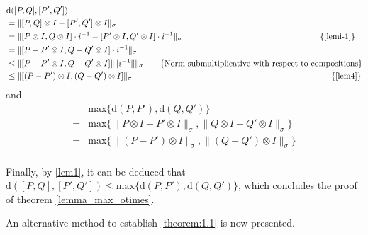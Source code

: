 \begin{equation} \label{eq:proof_theorem1.1_esq}
  \begin{split}
    & \text{d} ([P,Q],[P',Q'])  \\
    &=  \lVert  [P,Q] \otimes I - [P',Q'] \otimes I   \rVert_{\sigma}  \\
    &=   \lVert [P \otimes I, Q \otimes I] \cdot i^{-1}  - [P' \otimes I, Q' \otimes I]  \cdot i^{-1}  \rVert_{\sigma}   \hspace{165pt}  \text{\{\autoref{lemi-1}\}} \\
    &=  \lVert [P - P' \otimes I, Q-Q' \otimes I] \cdot i^{-1}  \rVert_{\sigma}   \\
    & \leq \lVert [P - P' \otimes I, Q-Q' \otimes I]  \rVert \lVert i^{-1}  \rVert \rVert_{\sigma} \hspace{20pt} \text{\{Norm submultiplicative with respect to compositions\}}  \\  
    & \leq \lVert [(P - P') \otimes I, (Q-Q') \otimes I]  \rVert_{\sigma} \hspace{235pt} \text{ \{\autoref{lem4}\}} \\
  \end{split}
  \end{equation}
and
\begin{equation} \label {eq:proof_theorem1.1_dir}
\begin{split}
   &  \text{max} \{\text{d} (P,P'),\text{d} (Q,Q')\} \\
   = &  \text{max}\{ \lVert P \otimes I - P' \otimes I \rVert_{\sigma}, \lVert Q \otimes I - Q'\otimes I \rVert_{\sigma} \}\\
   = &  \text{max}\{ \lVert (P - P') \otimes I \rVert_{\sigma}, \lVert (Q - Q') \otimes I \rVert_{\sigma} \}\\
\end{split}
\end{equation}

Finally, by  \autoref{lem1}, it can be deduced that $\text{d} ([P,Q],[P',Q']) \leq \text{max} \{\text{d} (P,P'),\text{d} (Q,Q')\}$, which concludes the proof of theorem \autoref{lemma_max_otimes}.
\vspace{10pt}


An alternative method to establish \autoref{theorem:1.1} is now presented.
\vspace{5pt}


